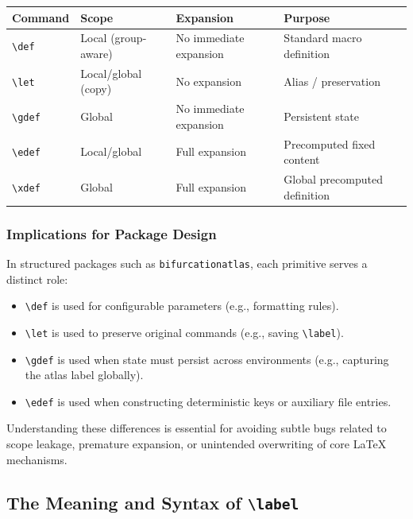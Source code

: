 \begin{center}
\begin{tabular}{l|l|l|l}
\textbf{Command} & \textbf{Scope} & \textbf{Expansion} & \textbf{Purpose} \\
\hline
\lstinline|\def|  & Local (group-aware) & No immediate expansion & Standard macro definition \\
\lstinline|\let|  & Local/global (copy)  & No expansion           & Alias / preservation \\
\lstinline|\gdef| & Global               & No immediate expansion & Persistent state \\
\lstinline|\edef| & Local/global         & Full expansion         & Precomputed fixed content \\
\lstinline|\xdef| & Global               & Full expansion         & Global precomputed definition \\
\end{tabular}
\end{center}

\subsubsection{Implications for Package Design}

In structured packages such as \texttt{bifurcationatlas}, each primitive serves a distinct role:

\begin{itemize}
\item \lstinline|\def| is used for configurable parameters (e.g., formatting rules).
\item \lstinline|\let| is used to preserve original commands (e.g., saving \lstinline|\label|).
\item \lstinline|\gdef| is used when state must persist across environments (e.g., capturing the atlas label globally).
\item \lstinline|\edef| is used when constructing deterministic keys or auxiliary file entries.
\end{itemize}

Understanding these differences is essential for avoiding subtle bugs related to scope leakage, premature expansion, or unintended overwriting of core \LaTeX{} mechanisms.
\subsection{The Meaning and Syntax of \texttt{\textbackslash label}}

